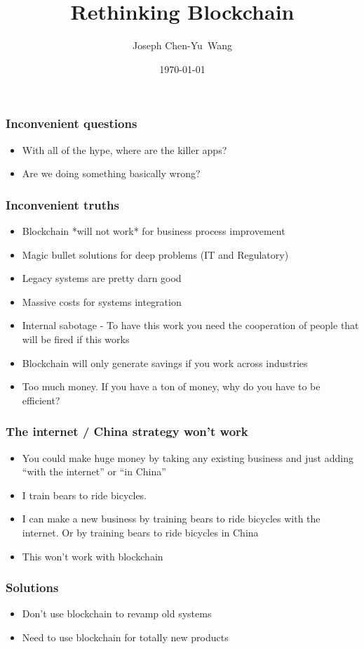 \documentclass{beamer}
\title {Rethinking Blockchain}
\author{Joseph Chen-Yu~Wang}
\institute{Bitquant Research Laboratories (Asia) Limited}
\date{\today}
\begin{document}
\frame{\titlepage}
\begin{frame}
  \frametitle{Inconvenient questions}
  \begin{itemize}
  \item With all of the hype, where are the killer apps?
  \item Are we doing something basically wrong?
    \end{itemize}
\end{frame}
\begin{frame}
  \frametitle{Inconvenient truths}
  \begin{itemize}
  \item Blockchain *will not work* for business process improvement
  \item Magic bullet solutions for deep problems (IT and Regulatory)
  \item Legacy systems are pretty darn good
  \item Massive costs for systems integration
  \item Internal sabotage - To have this work you need the
    cooperation of people that will be fired if this works
  \item Blockchain will only generate savings if you work across
    industries
  \item Too much money.  If you have a ton of money, why do you have
    to be efficient?
  \end{itemize}
\end{frame}
\begin{frame}
  \frametitle{The internet / China strategy won't work}
  \begin{itemize}
    \item You could make huge money by taking any existing
      business and just adding ``with the internet'' or ``in China''
    \item I train bears to ride bicycles.
    \item I can make a new business by training bears to ride bicycles
      with the internet.  Or by training bears to ride bicycles in
      China
    \item This won't work with blockchain
  \end{itemize}
\end{frame}
\begin{frame}
  \frametitle{Solutions}
  \begin{itemize}
  \item Don't use blockchain to revamp old systems
  \item Need to use blockchain for totally new products
  \end{itemize}
\end{frame}
\end{document}
